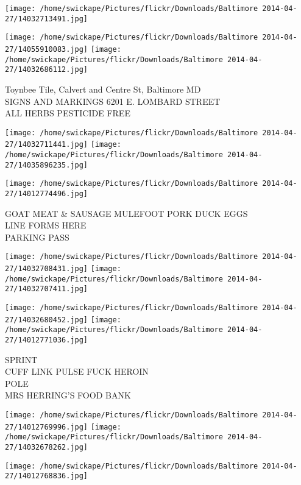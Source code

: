 \documentclass[10pt,letterpaper]{article}
\begin{document}
\texttt{[image: /home/swickape/Pictures/flickr/Downloads/Baltimore 2014-04-27/14032713491.jpg]}

\vspace{0.25in}
\texttt{[image: /home/swickape/Pictures/flickr/Downloads/Baltimore 2014-04-27/14055910083.jpg]}
\texttt{[image: /home/swickape/Pictures/flickr/Downloads/Baltimore 2014-04-27/14032686112.jpg]}

Toynbee Tile, Calvert and Centre St, Baltimore MD\\
SIGNS AND MARKINGS 6201 E. LOMBARD STREET\\
ALL HERBS PESTICIDE FREE\\
\pagebreak

\texttt{[image: /home/swickape/Pictures/flickr/Downloads/Baltimore 2014-04-27/14032711441.jpg]}
\texttt{[image: /home/swickape/Pictures/flickr/Downloads/Baltimore 2014-04-27/14035896235.jpg]}

\vspace{0.25in}
\texttt{[image: /home/swickape/Pictures/flickr/Downloads/Baltimore 2014-04-27/14012774496.jpg]}

GOAT MEAT \& SAUSAGE MULEFOOT PORK DUCK EGGS\\
LINE FORMS HERE\\
PARKING PASS\\
\pagebreak

\texttt{[image: /home/swickape/Pictures/flickr/Downloads/Baltimore 2014-04-27/14032708431.jpg]}
\texttt{[image: /home/swickape/Pictures/flickr/Downloads/Baltimore 2014-04-27/14032707411.jpg]}

\texttt{[image: /home/swickape/Pictures/flickr/Downloads/Baltimore 2014-04-27/14032680452.jpg]}
\texttt{[image: /home/swickape/Pictures/flickr/Downloads/Baltimore 2014-04-27/14012771036.jpg]}

SPRINT\\
CUFF LINK PULSE FUCK HEROIN\\
POLE\\
MRS HERRING'S FOOD BANK\\
\pagebreak

\texttt{[image: /home/swickape/Pictures/flickr/Downloads/Baltimore 2014-04-27/14012769996.jpg]}
\texttt{[image: /home/swickape/Pictures/flickr/Downloads/Baltimore 2014-04-27/14032678262.jpg]}

\texttt{[image: /home/swickape/Pictures/flickr/Downloads/Baltimore 2014-04-27/14012768836.jpg]}
\end{document}
